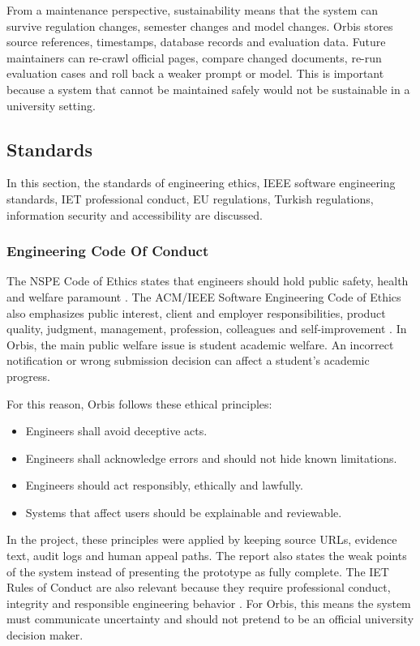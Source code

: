 \documentclass[a4paper,12pt]{article}
\begin{document}
From a maintenance perspective, sustainability means that the system can survive regulation changes, semester changes and model changes. Orbis stores source references, timestamps, database records and evaluation data. Future maintainers can re-crawl official pages, compare changed documents, re-run evaluation cases and roll back a weaker prompt or model. This is important because a system that cannot be maintained safely would not be sustainable in a university setting.

\subsection{Standards}
In this section, the standards of engineering ethics, IEEE software engineering standards, IET professional conduct, EU regulations, Turkish regulations, information security and accessibility are discussed.

\subsubsection{Engineering Code Of Conduct}
The NSPE Code of Ethics states that engineers should hold public safety, health and welfare paramount \cite{nspeCode}. The ACM/IEEE Software Engineering Code of Ethics also emphasizes public interest, client and employer responsibilities, product quality, judgment, management, profession, colleagues and self-improvement \cite{acmIeeeCode}. In Orbis, the main public welfare issue is student academic welfare. An incorrect notification or wrong submission decision can affect a student's academic progress.

For this reason, Orbis follows these ethical principles:

\begin{itemize}
    \item Engineers shall avoid deceptive acts.
    \item Engineers shall acknowledge errors and should not hide known limitations.
    \item Engineers should act responsibly, ethically and lawfully.
    \item Systems that affect users should be explainable and reviewable.
\end{itemize}

In the project, these principles were applied by keeping source URLs, evidence text, audit logs and human appeal paths. The report also states the weak points of the system instead of presenting the prototype as fully complete. The IET Rules of Conduct are also relevant because they require professional conduct, integrity and responsible engineering behavior \cite{ietRules}. For Orbis, this means the system must communicate uncertainty and should not pretend to be an official university decision maker.
\end{document}
